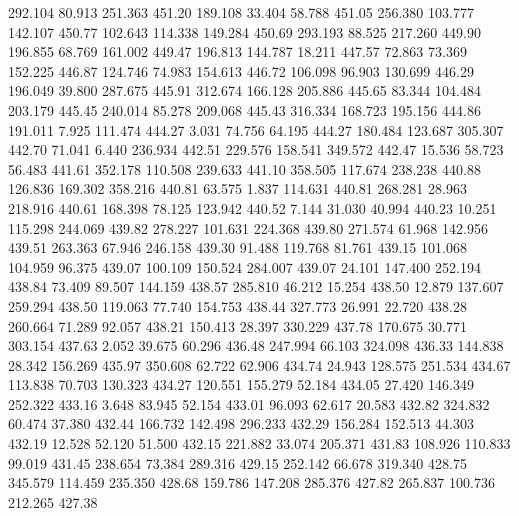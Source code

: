  292.104   80.913  251.363       451.20
 189.108   33.404   58.788       451.05
 256.380  103.777  142.107       450.77
 102.643  114.338  149.284       450.69
 293.193   88.525  217.260       449.90
 196.855   68.769  161.002       449.47
 196.813  144.787   18.211       447.57
  72.863   73.369  152.225       446.87
 124.746   74.983  154.613       446.72
 106.098   96.903  130.699       446.29
 196.049   39.800  287.675       445.91
 312.674  166.128  205.886       445.65
  83.344  104.484  203.179       445.45
 240.014   85.278  209.068       445.43
 316.334  168.723  195.156       444.86
 191.011    7.925  111.474       444.27
   3.031   74.756   64.195       444.27
 180.484  123.687  305.307       442.70
  71.041    6.440  236.934       442.51
 229.576  158.541  349.572       442.47
  15.536   58.723   56.483       441.61
 352.178  110.508  239.633       441.10
 358.505  117.674  238.238       440.88
 126.836  169.302  358.216       440.81
  63.575    1.837  114.631       440.81
 268.281   28.963  218.916       440.61
 168.398   78.125  123.942       440.52
   7.144   31.030   40.994       440.23
  10.251  115.298  244.069       439.82
 278.227  101.631  224.368       439.80
 271.574   61.968  142.956       439.51
 263.363   67.946  246.158       439.30
  91.488  119.768   81.761       439.15
 101.068  104.959   96.375       439.07
 100.109  150.524  284.007       439.07
  24.101  147.400  252.194       438.84
  73.409   89.507  144.159       438.57
 285.810   46.212   15.254       438.50
  12.879  137.607  259.294       438.50
 119.063   77.740  154.753       438.44
 327.773   26.991   22.720       438.28
 260.664   71.289   92.057       438.21
 150.413   28.397  330.229       437.78
 170.675   30.771  303.154       437.63
   2.052   39.675   60.296       436.48
 247.994   66.103  324.098       436.33
 144.838   28.342  156.269       435.97
 350.608   62.722   62.906       434.74
  24.943  128.575  251.534       434.67
 113.838   70.703  130.323       434.27
 120.551  155.279   52.184       434.05
  27.420  146.349  252.322       433.16
   3.648   83.945   52.154       433.01
  96.093   62.617   20.583       432.82
 324.832   60.474   37.380       432.44
 166.732  142.498  296.233       432.29
 156.284  152.513   44.303       432.19
  12.528   52.120   51.500       432.15
 221.882   33.074  205.371       431.83
 108.926  110.833   99.019       431.45
 238.654   73.384  289.316       429.15
 252.142   66.678  319.340       428.75
 345.579  114.459  235.350       428.68
 159.786  147.208  285.376       427.82
 265.837  100.736  212.265       427.38
